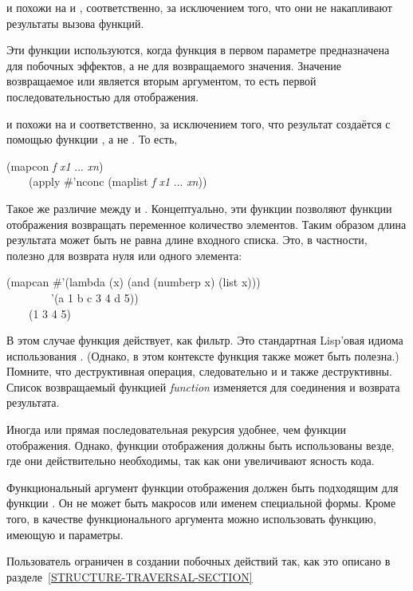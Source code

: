 \begin{defun}[Функция]
 и  похожи на  и , соответственно,
за исключением того, что они не накапливают результаты вызова функций.

Эти функции используются, когда функция в первом параметре предназначена для
побочных эффектов, а не для возвращаемого значения.
Значение возвращаемое  или  является вторым аргументом, то
есть первой последовательностью для отображения.

 и  похожи на  и 
соответственно, за исключением того, что результат создаётся с помощью функции
, а не . То есть, 
\begin{lisp}
(mapcon \emph{f} \emph{x1} ... \emph{xn}) \\
~~~\EQ\ (apply \#'nconc (maplist \emph{f} \emph{x1} ... \emph{xn}))
\end{lisp}
Такое же различие между  и .
Концептуально, эти функции позволяют функции отображения возвращать переменное
количество элементов. Таким образом длина результата может быть не равна длине
входного списка.
Это, в частности, полезно для возврата нуля или одного элемента:
\begin{lisp}
(mapcan \#'(lambda (x) (and (numberp x) (list x))) \\
~~~~~~~~'(a 1 b c 3 4 d 5)) \\
~~~\EV\ (1 3 4 5)
\end{lisp}
В этом случае функция действует, как фильтр. Это стандартная Lisp'овая идиома
использования .
(Однако, в этом контексте функция  также может быть полезна.)
Помните, что  деструктивная операция, следовательно и  и
 также деструктивны. Список возвращаемый функцией \emph{function}
изменяется для соединения и возврата результата.

Иногда  или прямая последовательная рекурсия удобнее, чем функции
отображения. Однако, функции отображения должны быть использованы везде, где они
действительно необходимы, так как они увеличивают ясность кода.

Функциональный аргумент функции отображения должен быть подходящим для функции
. Он не может быть макросов или именем специальной формы.
Кроме того, в качестве функционального аргумента можно использовать функцию,
имеющую  и  параметры.

Пользователь ограничен в создании побочных действий так, как это описано в
разделе~\ref{STRUCTURE-TRAVERSAL-SECTION}
\end{defun}

